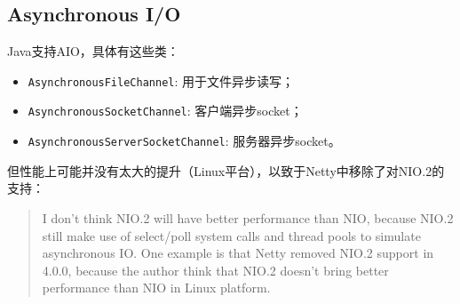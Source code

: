 \documentclass[12pt]{article}
\begin{document}
\begin{Shaded}
\begin{Highlighting}[]
       \OperatorTok{(} \OperatorTok{,}
                                       \OperatorTok{)}
              \OperatorTok{\{}
         \OperatorTok{=} \OperatorTok{(}\OperatorTok{)}\OperatorTok{();}
\OperatorTok{(}\OperatorTok{);}
\OperatorTok{();}
        \OperatorTok{=}\OperatorTok{(}\OperatorTok{();}
        \OperatorTok{(} \OperatorTok{+}\OperatorTok{);}
\OperatorTok{();}
    \OperatorTok{\}}
\OperatorTok{\}}
\end{Highlighting}
\end{Shaded}

\subsection{Asynchronous I/O}\label{asynchronous-io-1}

Java支持AIO，具体有这些类：

\begin{itemize}
\tightlist
\item
  \texttt{AsynchronousFileChannel}: 用于文件异步读写；
\item
  \texttt{AsynchronousSocketChannel}: 客户端异步socket；
\item
  \texttt{AsynchronousServerSocketChannel}: 服务器异步socket。
\end{itemize}

但性能上可能并没有太大的提升（Linux平台），以致于Netty中移除了对NIO.2的支持：

\begin{quote}
I don't think NIO.2 will have better performance than NIO, because NIO.2 still make use of select/poll system calls and thread pools to simulate asynchronous IO. One example is that Netty removed NIO.2 support in 4.0.0, because the author think that NIO.2 doesn't bring better performance than NIO in Linux platform.
\end{quote}
\end{document}

